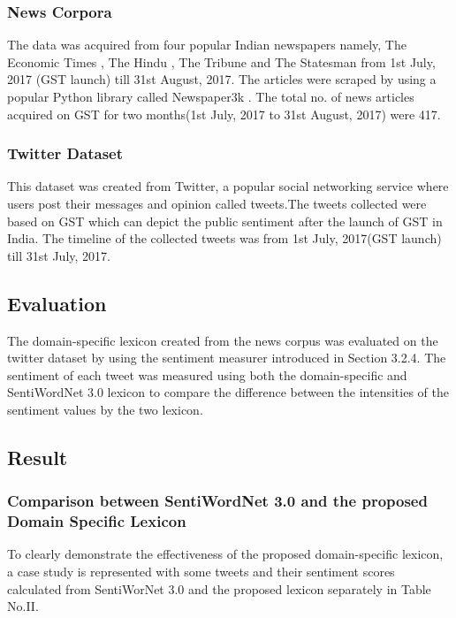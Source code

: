 \documentclass[conference]{IEEEtran}
\begin{document}
\subsubsection{News Corpora}

The data was acquired from four popular Indian newspapers namely, The Economic Times \cite{c8}, The Hindu \cite{c9}, The Tribune \cite{c10} and The Statesman \cite{c11} from  1st July, 2017 (GST launch) till 31st August, 2017. The articles were scraped by using a popular Python library called Newspaper3k \cite{c7}. The total no. of news articles acquired on GST for two months(1st July, 2017 to 31st August, 2017) were 417.

\subsubsection{Twitter Dataset}
This dataset was created from Twitter, a popular social networking service where users post their messages and opinion called tweets.The tweets collected were based on GST which can depict the public sentiment after the launch of GST in India. The timeline of the collected tweets was from 1st July, 2017(GST launch) till 31st July, 2017.
\subsection{Evaluation}
The domain-specific lexicon created from the news corpus was evaluated on the twitter dataset by using the sentiment measurer introduced in Section 3.2.4. The sentiment of each tweet was measured using both the domain-specific and SentiWordNet 3.0 lexicon to compare the difference between the intensities of the sentiment values by the two lexicon.

\subsection{Result}
\subsubsection{Comparison between SentiWordNet 3.0 and the proposed Domain Specific Lexicon}

To clearly demonstrate the effectiveness of the proposed domain-specific lexicon, a case study is represented with some tweets and their sentiment scores calculated from SentiWorNet 3.0 and the proposed lexicon separately in Table No.II.
\end{document}
